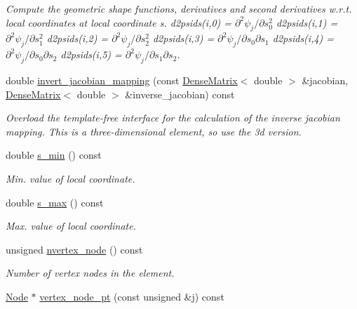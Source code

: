 \begin{DoxyCompactItemize}
\begin{DoxyCompactList}\small\item\em Compute the geometric shape functions, derivatives and second derivatives w.\+r.\+t. local coordinates at local coordinate s. d2psids(i,0) = $ \partial^2 \psi_j / \partial s_0^2 $ d2psids(i,1) = $ \partial^2 \psi_j / \partial s_1^2 $ d2psids(i,2) = $ \partial^2 \psi_j / \partial s_2^2 $ d2psids(i,3) = $ \partial^2 \psi_j / \partial s_0 \partial s_1 $ d2psids(i,4) = $ \partial^2 \psi_j / \partial s_0 \partial s_2 $ d2psids(i,5) = $ \partial^2 \psi_j / \partial s_1 \partial s_2 $. \end{DoxyCompactList}\item 
double \hyperlink{classoomph_1_1QElement_3_013_00_01NNODE__1D_01_4_aaeb28afe77ae5648251f6030340acdbd}{invert\+\_\+jacobian\+\_\+mapping} (const \hyperlink{classoomph_1_1DenseMatrix}{Dense\+Matrix}$<$ double $>$ \&jacobian, \hyperlink{classoomph_1_1DenseMatrix}{Dense\+Matrix}$<$ double $>$ \&inverse\+\_\+jacobian) const
\begin{DoxyCompactList}\small\item\em Overload the template-\/free interface for the calculation of the inverse jacobian mapping. This is a three-\/dimensional element, so use the 3d version. \end{DoxyCompactList}\item 
double \hyperlink{classoomph_1_1QElement_3_013_00_01NNODE__1D_01_4_a485dca6ed38c5c9653c5dcce3213ec2a}{s\+\_\+min} () const
\begin{DoxyCompactList}\small\item\em Min. value of local coordinate. \end{DoxyCompactList}\item 
double \hyperlink{classoomph_1_1QElement_3_013_00_01NNODE__1D_01_4_a2f387d9b2b15f85511b4347cd3d20533}{s\+\_\+max} () const
\begin{DoxyCompactList}\small\item\em Max. value of local coordinate. \end{DoxyCompactList}\item 
unsigned \hyperlink{classoomph_1_1QElement_3_013_00_01NNODE__1D_01_4_a70472a8a3a9cd44d853c70b631062e9c}{nvertex\+\_\+node} () const
\begin{DoxyCompactList}\small\item\em Number of vertex nodes in the element. \end{DoxyCompactList}\item 
\hyperlink{classoomph_1_1Node}{Node} $\ast$ \hyperlink{classoomph_1_1QElement_3_013_00_01NNODE__1D_01_4_a265f8f0f3d0067ff52648a7c3b50d9fe}{vertex\+\_\+node\+\_\+pt} (const unsigned \&j) const

\end{DoxyCompactItemize}
